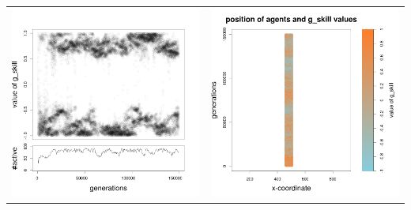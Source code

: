 \documentclass[a4paper,10pt]{article}
\begin{document}
\begin{table}[H]
\begin{tabular}{cc}
 \newline
 \includegraphics[width=\imgSize]{../images/5StaticEnv/Gplot58_staticEnv0}&\includegraphics[width=\imgSize]{../images/5StaticEnv/Gplot58Static_staticEnv0}\\
\end{tabular}

\end{table}
\end{document}
